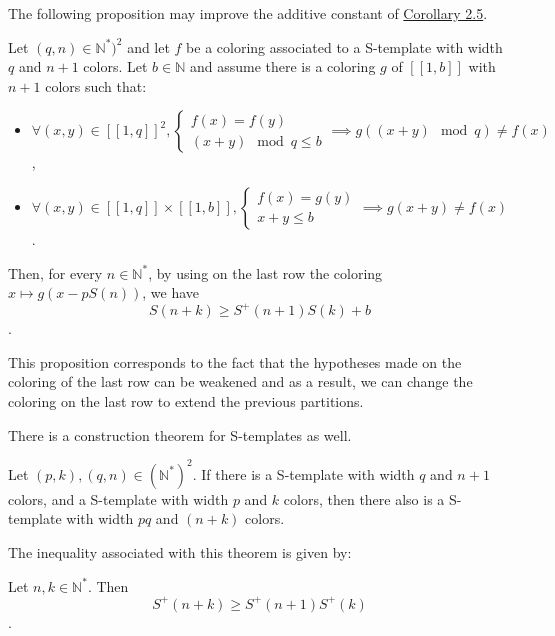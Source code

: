 The following proposition may improve the additive constant of \hyperref[Corollary2.5]{Corollary 2.5}.

\begin{proposition}
\label{Proposition2.6}
Let \((q, n) \in \mathbb{N}^*)^2\) and let \(f\) be a coloring associated to a S-template with width \(q\) and \(n+1\) 
colors. Let \(b \in \mathbb{N}\) and assume there is a coloring \(g\) of 
\([\![1, b]\!]\) with \(n+1\) colors such that:
	
\begin{itemize}
\item \(\forall (x, y) \in [\![1, q]\!]^2, \left\{
	\begin{array}{l}
		f(x) = f(y) \\
		(x + y) \mod q \leqslant b
	\end{array}
	\right. \implies g((x + y) \mod q) \neq f(x)\),
\item \(\forall (x, y) \in [\![1, q]\!] \times  [\![1, b]\!],  \left\{
	\begin{array}{l}
		f(x) = g(y) \\
		x + y \leqslant b
	\end{array}
	\right. \implies g(x + y) \neq f(x)\).
\end{itemize}
	
Then, for every \(n \in \mathbb{N}^*\), by using on the last row the coloring \(x \longmapsto g(x - p S(n))\), we have
\[ S(n+k) \geqslant S^+(n+1)S(k) + b\].
\end{proposition}
This proposition corresponds to the fact that the hypotheses made on the coloring of the last row can be weakened and as a result, we can change the coloring on the last row to extend the previous partitions.
\newline

There is a construction theorem for S-templates as well.

\begin{theorem}
	Let \((p,k), (q,n) \in (\mathbb{N}^*)^2\). If there is a S-template with width \(q\) and \(n+1\) colors,
	and a S-template with width \(p\) and \(k\) colors, then there also is a S-template with width \(pq\) and \((n+k)\) 
	colors.
	\end{theorem}
	
	The inequality associated with this theorem is given by:
	
\begin{corollary}
	Let \(n, k \in \mathbb{N}^*\). Then
	\[ S^+(n+k) \geqslant S^+(n+1)S^+(k) \].
\end{corollary}

